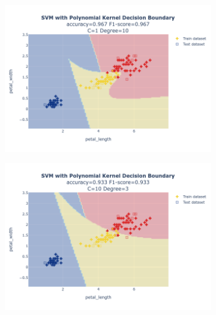 \documentclass{article}
\begin{document}
\begin{figure}
\begin{subfigure}{0.3\textwidth}
        \includegraphics[scale=.13]{images/implementation/q1/polynomial_kernel/petal_length_petal_width_1_10.png}
    \end{subfigure}
    \newline
    \begin{subfigure}{0.3\textwidth}
        \centering
        \includegraphics[scale=.13]{images/implementation/q1/polynomial_kernel/petal_length_petal_width_10_3.png}
    \end{subfigure}
    \hfill
    \begin{subfigure}{0.3\textwidth}
        \centering

\end{subfigure}
\end{figure}
\end{document}
